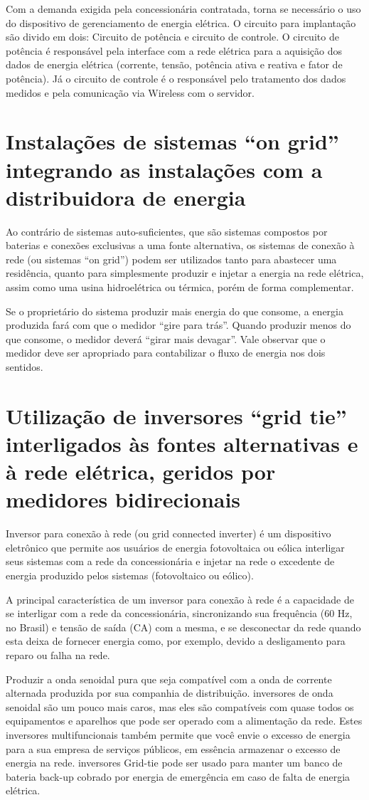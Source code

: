 Com a demanda exigida pela concessionária contratada, torna se necessário o uso do dispositivo de gerenciamento de energia elétrica.
O circuito para implantação são divido em dois: Circuito de potência e circuito de controle.
O circuito de potência é responsável pela interface com a rede elétrica para a aquisição dos dados de energia elétrica (corrente, tensão, potência ativa e reativa e fator de potência). Já o circuito de controle é o responsável pelo tratamento dos dados medidos e pela comunicação via Wireless com o servidor.

\section{Instalações de sistemas “on grid” integrando as instalações com a distribuidora de energia}
Ao contrário de sistemas auto-suficientes, que são sistemas compostos por baterias e conexões exclusivas a uma fonte alternativa, os sistemas de conexão à rede (ou sistemas “on grid”) podem ser utilizados tanto para abastecer uma residência, quanto para simplesmente produzir e injetar a energia na rede elétrica, assim como uma usina hidroelétrica ou térmica, porém de forma complementar.

Se o proprietário do sistema produzir mais energia do que consome, a energia produzida fará com que o medidor “gire para trás”. Quando produzir menos do que consome, o medidor deverá “girar mais devagar”. Vale observar que o medidor deve ser apropriado para contabilizar o fluxo de energia nos dois sentidos.

\section{Utilização de inversores “grid tie” interligados às fontes alternativas e à rede elétrica, geridos por medidores bidirecionais}
Inversor para conexão à rede (ou grid connected inverter) é um dispositivo eletrônico que permite aos usuários de energia fotovoltaica ou eólica interligar seus sistemas com a rede da concessionária e injetar na rede o excedente de energia produzido pelos sistemas (fotovoltaico ou eólico). 

A principal característica de um inversor para conexão à rede é a capacidade de se interligar com a rede da concessionária, sincronizando sua frequência (60 Hz, no Brasil) e tensão de saída (CA) com a mesma, e se desconectar da rede quando esta deixa de fornecer energia como, por exemplo, devido a desligamento para reparo ou falha na rede. 

Produzir a onda senoidal pura que seja compatível com a onda de corrente alternada produzida por sua companhia de distribuição. inversores de onda senoidal são um pouco mais caros, mas eles são compatíveis com quase todos os equipamentos e aparelhos que pode ser operado com a alimentação da rede. Estes inversores multifuncionais também permite que você envie o excesso de energia para a sua empresa de serviços públicos, em essência armazenar o excesso de energia na rede. inversores Grid-tie pode ser usado para manter um banco de bateria back-up cobrado por energia de emergência em caso de falta de energia elétrica.
